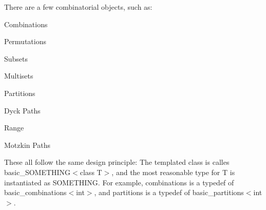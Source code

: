 There are a few combinatorial objects, such as\-:
\begin{DoxyItemize}
\item Combinations
\item Permutations
\item Subsets
\item Multisets
\item Partitions
\item Dyck Paths
\item Range
\item Motzkin Paths
\end{DoxyItemize}

These all follow the same design principle\-: The templated class is calles basic\-\_\-\-S\-O\-M\-E\-T\-H\-I\-N\-G$<$class T$>$, and the most reasonable type for T is instantiated as S\-O\-M\-E\-T\-H\-I\-N\-G. For example, {\ttfamily combinations} is a typedef of {\ttfamily basic\-\_\-combinations$<$int$>$}, and {\ttfamily partitions} is a typedef of {\ttfamily basic\-\_\-partitions$<$int$>$}. 